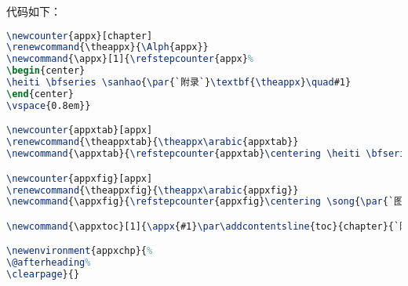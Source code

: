 代码如下：

\begin{lstlisting}[language=TeX]
\newcounter{appx}[chapter]
\renewcommand{\theappx}{\Alph{appx}}
\newcommand{\appx}[1]{\refstepcounter{appx}%
\begin{center}
\heiti \bfseries \sanhao{\par{`附录`}\textbf{\theappx}\quad#1}
\end{center}
\vspace{0.8em}}

\newcounter{appxtab}[appx]
\renewcommand{\theappxtab}{\theappx\arabic{appxtab}}
\newcommand{\appxtab}{\refstepcounter{appxtab}\centering \heiti \bfseries {\par{`表`\hspace{0.2em}}\theappxtab}\quad}

\newcounter{appxfig}[appx]
\renewcommand{\theappxfig}{\theappx\arabic{appxfig}}
\newcommand{\appxfig}{\refstepcounter{appxfig}\centering \song{\par{`图`\hspace{0.2em}}\theappxfig\quad}}

\newcommand{\appxtoc}[1]{\appx{#1}\par\addcontentsline{toc}{chapter}{`附录`\theappx}}

\newenvironment{appxchp}{%
\@afterheading%
\clearpage}{}
\end{lstlisting}


